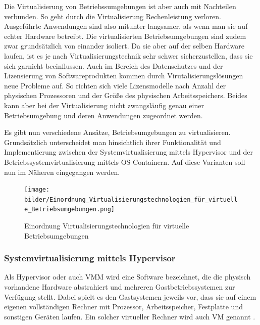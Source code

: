Die Virtualisierung von Betriebssumgebungen ist aber auch mit Nachteilen verbunden. So geht durch die Virtualisierung Rechenleistung verloren. Ausgeführte Anwendungen sind also mitunter langsamer, als wenn man sie auf echter Hardware betreibt. Die virtualisierten Betriebsumgebungen sind zudem zwar grundsätzlich von einander isoliert. Da sie aber auf der selben Hardware laufen, ist es je nach Virtualisierungstechnik sehr schwer sicherzustellen, dass sie sich garnicht beeinflussen. Auch im Bereich des Datenschutzes und der Lizensierung von Softwareprodukten kommen durch Virutalisierungslösungen neue Probleme auf. So richten sich viele Lizensmodelle nach Anzahl der physischen Prozessoren und der Größe des physischen Arbeitsspeichers. Beides kann aber bei der Virtualisierung nicht zwangsläufig genau einer Betriebsumgebung und deren Anwendungen zugeordnet werden.

Es gibt nun verschiedene Ansätze, Betriebsumgebungen zu virtualisieren. Grundsätzlich unterscheidet man hinsichtlich ihrer Funktionalität und Implementierung zwischen der Systemvirtualisierung mittels Hypervisor und der Betriebssystemvirtualisierung mittels OS-Containern. Auf diese Varianten soll nun im Näheren eingegangen werden.

\begin{figure}[!ht]
  \begin{center}
    \texttt{[image: bilder/Einordnung\_Virtualisierungstechnologien\_für\_virtuelle\_Betriebsumgebungen.png]}
    \caption{Einordnung Virtualisierungstechnologien für virtuelle Betriebsumgebungen \citep{Hirschbach06}}
  \end{center}
\end{figure}

\subsubsection{Systemvirtualisierung mittels Hypervisor}

Als Hypervisor oder auch \ac{VMM} wird eine Software bezeichnet, die die physisch vorhandene Hardware abstrahiert und mehreren Gastbetriebssystemen zur Verfügung stellt. Dabei spielt es den Gastsystemen jeweils vor, dass sie auf einem eigenen vollständigen Rechner mit Prozessor, Arbeitsspeicher, Festplatte und sonstigen Geräten laufen. Ein solcher virtueller Rechner wird auch \ac{VM} genannt \citep[Vgl.][S. 413]{PopGol74}.

